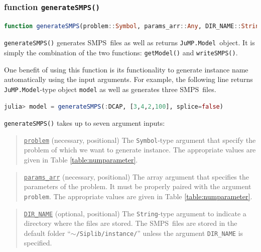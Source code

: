 \documentclass{hitec}
\newcommand{\smps}{\textsf{SMPS}}
\newcommand{\jumpmodel}{\texttt{JuMP.Model}}
\begin{document}
	
	
	\subsubsection{function \texttt{generateSMPS()}}
	
	\begin{lstlisting}[frame=single,language=julia]
	function generateSMPS(problem::Symbol, params_arr::Any, DIR_NAME::String="$(dirname(@__FILE__))/../instance" ; seed::Int=1, lprelax::Int=0, genericnames::Bool=true, splice::Bool=true)
	\end{lstlisting}
	
	\texttt{generateSMPS()} generates \smps\ files as well as returns \jumpmodel\ object. It is simply the combination of the two functions: \texttt{getModel()} and \texttt{writeSMPS()}. 
	
	One benefit of using this function is its functionality to generate instance name automatically using the input arguments. For example, the following line returns \jumpmodel-type object \texttt{model} as well as generates three \smps\ files.
	\begin{lstlisting}[frame=single,language=julia]
	julia> model = generateSMPS(:DCAP, [3,4,2,100], splice=false)
	\end{lstlisting}
	
	\texttt{generateSMPS()} takes up to seven argument inputs:
	\begin{quote}
		\noindent\underline{\texttt{problem}} (necessary, positional) The \texttt{Symbol}-type argument that specify the problem of which we want to generate instance. The appropriate values are given in Table \ref{table:numparameter}. 
	\end{quote}
	
	\begin{quote}
		\noindent\underline{\texttt{params\_arr}} (necessary, positional) The array argument that specifies the parameters of the problem. It must be properly paired with the argument \texttt{problem}. The appropriate values are given in Table \ref{table:numparameter}. 
	\end{quote}
	
	\begin{quote}
		\noindent\underline{\texttt{DIR\_NAME}} (optional, positional) The \texttt{String}-type argument to indicate a directory where the files are stored. The \smps\ files are stored in the default folder ``\texttt{$\sim$/Siplib/instance/}'' unless the argument \texttt{DIR\_NAME} is specified.
	\end{quote}
	
\end{document}
